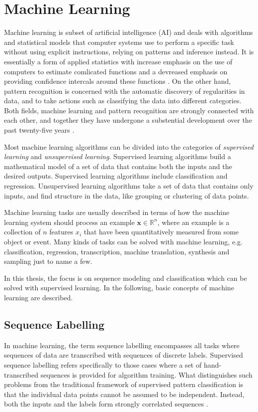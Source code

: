 \documentclass{scrartcl}
\begin{document}
\newpage

\section{Machine Learning}

Machine learning is subset of artificial intelligence (AI) and deals with algorithms and statistical models that computer systems use to perform a specific task without using explicit instructions, relying on patterns and inference instead. It is essentially a form of applied statistics with increase emphasis on the use of computers to estimate comlicated functions and a devreased emphasis on providing confidence intercals around these functions \cite{Goodfellow2016}. On the other hand, pattern recognition is concerned with the automatic discovery of regularities in data, and to take actions such as classifying the data into different categories. Both fields, machine learning and pattern recognition are strongly connected with each other, and together they have undergone a substential development over the past twenty-five years \cite{Bishop2006}.

Most machine learning algorithms can be divided into the categories of \emph{supervised learning} and \emph{unsupervised learning}. Supervised learning algorithms build a mathematical model of a set of data that contains both the inputs and the desired outputs. Supervised learning algorithms include classification and regression. Unsupervised learning algorithms take a set of data that contains only inputs, and find structure in the data, like grouping or clustering of data points. 

Machine learning tasks are usually described in terms of how the machine learning system should process an example $\mathbf x \in \mathbb R^n$, where an example is a collection of $n$ features $x_i$ that have been quantitatively measured from some object or event. Many kinds of tasks can be solved with machine learning, e.g. classification, regression, transcription, machine translation, synthesis and sampling just to name a few.

In this thesis, the focus is on sequence modeling and classification which can be solved with supervised learning. In the following, basic concepts of machine learning are described. 

\subsection{Sequence Labelling}
In machine learning, the term sequence labelling encompasses all tasks where sequences of data are transcribed with sequences of discrete labels. Supervised sequence labelling refers specifically to those cases where a set of hand-transcribed sequences is provided for algorithm training. What distinguishes such problems from the traditional framework of supervised pattern classification is that the individual data points cannot be assumed to be independent. Instead, both the inputs and the labels form strongly correlated sequences \cite{Graves2012}.
\end{document}
